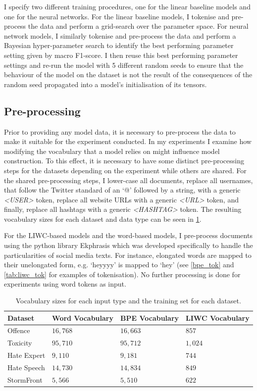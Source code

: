 I specify two different training procedures, one for the linear baseline models and one for the neural networks.
For the linear baseline models, I tokenise and pre-process the data and perform a grid-search over the parameter space.
For neural network models, I similarly tokenise and pre-process the data and perform a Bayesian hyper-parameter search to identify the best performing parameter setting given by macro F1-score. I then reuse this best performing parameter settings and re-run the model with 5 different random seeds to ensure that the behaviour of the model on the dataset is not the result of the consequences of the random seed propagated into a model's initialisation of its tensors.

\subsection{Pre-processing}

Prior to providing any model data, it is necessary to pre-process the data to make it suitable for the experiment conducted. In my experiments I examine how modifying the vocabulary that a model relies on might influence model construction. To this effect, it is necessary to have some distinct pre-processing steps for the datasets depending on the experiment while others are shared. For the shared pre-processing steps, I lower-case all documents, replace all usernames, that follow the Twitter standard of an `@' followed by a string, with a generic \textit{<USER>} token, replace all website URLs with a generic \textit{<URL>} token, and finally, replace all hashtags with a generic \textit{<HASHTAG>} token. The resulting vocabulary sizes for each dataset and data type can be seen in \cref{tab:vocab_sizes}.

For the LIWC-based models and the word-based models, I pre-process documents using the python library Ekphrasis \citep{baziotis:2017} which was developed specifically to handle the particularities of social media texts. For instance, elongated words are mapped to their unelongated form, e.g. `heyyyy' is mapped to `hey' (see \cref{bpe_tok} and \cref{tab:liwc_tok} for examples of tokenisation). No further processing is done for experiments using word tokens as input.

\begin{table}[]
  \centering
  \begin{tabular}{llll}
    Dataset     & Word Vocabulary & BPE Vocabulary & LIWC Vocabulary \\\hline
    Offence     & $16,768$        & $16,663$       & $857$           \\
    Toxicity    & $95,710$        & $95,712$       & $1,024$         \\
    Hate Expert & $9,110$         & $9,181$        & $744$           \\
    Hate Speech & $14,730$        & $14,834$       & $849$           \\
    StormFront  & $5,566$         & $5,510$        & $622$
  \end{tabular}
  \caption{Vocabulary sizes for each input type and the training set for each dataset.}
  \label{tab:vocab_sizes}
\end{table}

